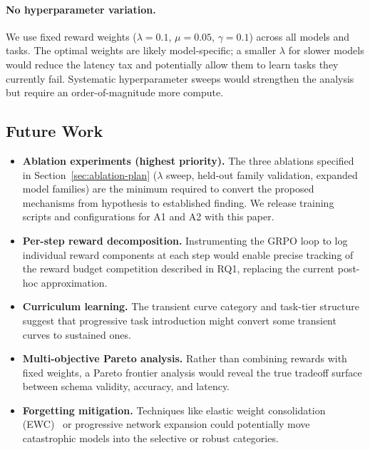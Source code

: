 \documentclass[11pt]{article}
\begin{document}
\paragraph{No hyperparameter variation.}
We use fixed reward weights ($\lambda = 0.1$, $\mu = 0.05$, $\gamma = 0.1$) across all models and tasks.  The optimal weights are likely model-specific; a smaller $\lambda$ for slower models would reduce the latency tax and potentially allow them to learn tasks they currently fail.  Systematic hyperparameter sweeps would strengthen the analysis but require an order-of-magnitude more compute.

\subsection{Future Work}

\begin{itemize}[leftmargin=*]
\item \textbf{Ablation experiments (highest priority).} The three ablations specified in Section~\ref{sec:ablation-plan} ($\lambda$ sweep, held-out family validation, expanded model families) are the minimum required to convert the proposed mechanisms from hypothesis to established finding.  We release training scripts and configurations for A1 and A2 with this paper.

\item \textbf{Per-step reward decomposition.} Instrumenting the GRPO loop to log individual reward components at each step would enable precise tracking of the reward budget competition described in RQ1, replacing the current post-hoc approximation.

\item \textbf{Curriculum learning.} The transient curve category and task-tier structure suggest that progressive task introduction might convert some transient curves to sustained ones.

\item \textbf{Multi-objective Pareto analysis.} Rather than combining rewards with fixed weights, a Pareto frontier analysis would reveal the true tradeoff surface between schema validity, accuracy, and latency.

\item \textbf{Forgetting mitigation.} Techniques like elastic weight consolidation (EWC)~\cite{kirkpatrick2017ewc} or progressive network expansion could potentially move catastrophic models into the selective or robust categories.
\end{itemize}
\end{document}
